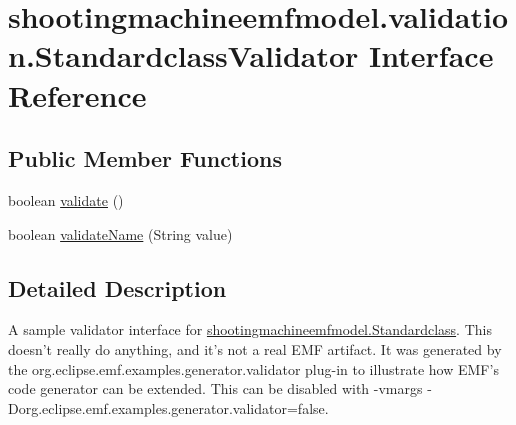 \hypertarget{interfaceshootingmachineemfmodel_1_1validation_1_1_standardclass_validator}{\section{shootingmachineemfmodel.\-validation.\-Standardclass\-Validator Interface Reference}
\label{interfaceshootingmachineemfmodel_1_1validation_1_1_standardclass_validator}
}
\subsection*{Public Member Functions}
\begin{DoxyCompactItemize}
\item 
boolean \hyperlink{interfaceshootingmachineemfmodel_1_1validation_1_1_standardclass_validator_a6647a7804888af6b8e24e3ccbb20fa6a}{validate} ()
\item 
boolean \hyperlink{interfaceshootingmachineemfmodel_1_1validation_1_1_standardclass_validator_af9e441474716ba682c7b44c9fcfb67ef}{validate\-Name} (String value)
\end{DoxyCompactItemize}


\subsection{Detailed Description}
A sample validator interface for \hyperlink{interfaceshootingmachineemfmodel_1_1_standardclass}{shootingmachineemfmodel.\-Standardclass}. This doesn't really do anything, and it's not a real E\-M\-F artifact. It was generated by the org.\-eclipse.\-emf.\-examples.\-generator.\-validator plug-\/in to illustrate how E\-M\-F's code generator can be extended. This can be disabled with -\/vmargs -\/\-Dorg.\-eclipse.\-emf.\-examples.\-generator.\-validator=false. 

